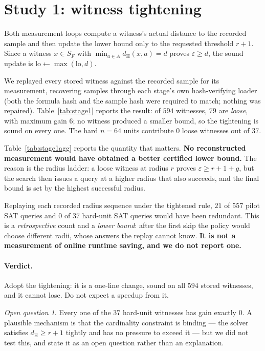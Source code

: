\documentclass[11pt,a4paper]{article}
\theoremstyle{plain}
\theoremstyle{definition}
\theoremstyle{remark}
\newtheorem{conjecture}[theorem]{Open question}
\newcommand{\dH}{d_{\mathrm{H}}}
\newcommand{\SF}{S_F}
\begin{document}


\section{Study 1: witness tightening}\label{sec:stage1}

Both measurement loops compute a witness's actual distance to the recorded
sample and then update the lower bound only to the requested threshold $r+1$.
Since a witness $x \in \SF$ with $\min_{a \in A}\dH(x,a) = d$ proves
$\varepsilon \ge d$, the sound update is $\mathrm{lo} \leftarrow \max(\mathrm{lo}, d)$.

We replayed every stored witness against the recorded sample for its
measurement, recovering samples through each stage's own hash-verifying loader
(both the formula hash and the sample hash were required to match; nothing was
repaired). Table~\ref{tab:stage1} reports the result: of $594$ witnesses, $79$ are
\emph{loose}, with maximum gain $6$; no witness produced a smaller bound, so the
tightening is sound on every one. The hard $n=64$ units contribute $0$ loose
witnesses out of $37$.

Table~\ref{tab:stage1agg} reports the quantity that matters. \textbf{No reconstructed measurement
would have obtained a better certified lower bound.} The reason is the radius
ladder: a loose witness at radius $r$ proves $\varepsilon \ge r+1+g$, but the
search then issues a query at a higher radius that also succeeds, and the final
bound is set by the highest successful radius.

Replaying each recorded radius sequence under the tightened rule, $21$ of $557$
pilot SAT queries and $0$ of $37$ hard-unit SAT queries would have been
redundant. This is a \emph{retrospective} count and a \emph{lower bound}: after
the first skip the policy would choose different radii, whose answers the replay
cannot know. \textbf{It is not a measurement of online runtime saving, and we do
not report one.}

\paragraph{Verdict.} Adopt the tightening: it is a one-line change, sound on all
$594$ stored witnesses, and it cannot lose. Do not expect a speedup from it.

\begin{conjecture}
Every one of the $37$ hard-unit witnesses has gain exactly $0$. A plausible
mechanism is that the cardinality constraint is binding --- the solver satisfies
$\dH \ge r+1$ tightly and has no pressure to exceed it --- but we did not test
this, and state it as an open question rather than an explanation.
\end{conjecture}
\end{document}
